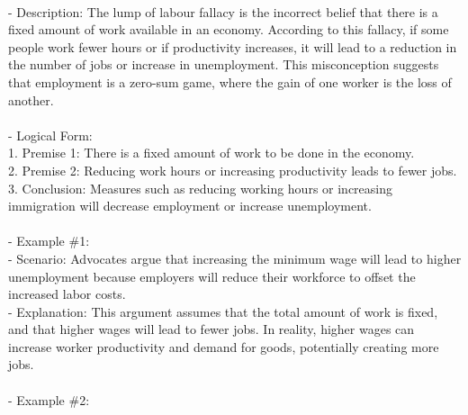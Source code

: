 \documentclass[a4paper,12pt,single,pdftex]{scrartcl}
\begin{document}
    
      
    \\

    
      - Description: The lump of labour fallacy is the incorrect belief that there is a fixed amount of work available in an economy. According to this fallacy, if some people work fewer hours or if productivity increases, it will lead to a reduction in the number of jobs or increase in unemployment. This misconception suggests that employment is a zero-sum game, where the gain of one worker is the loss of another.
    \\

    
      
    \\

    
      - Logical Form:
    \\

    
        1. Premise 1: There is a fixed amount of work to be done in the economy.
    \\

    
        2. Premise 2: Reducing work hours or increasing productivity leads to fewer jobs.
    \\

    
        3. Conclusion: Measures such as reducing working hours or increasing immigration will decrease employment or increase unemployment.
    \\

    
      
    \\

    
      - Example \#1:
    \\

    
        - Scenario: Advocates argue that increasing the minimum wage will lead to higher unemployment because employers will reduce their workforce to offset the increased labor costs.
    \\

    
        - Explanation: This argument assumes that the total amount of work is fixed, and that higher wages will lead to fewer jobs. In reality, higher wages can increase worker productivity and demand for goods, potentially creating more jobs.
    \\

    
      
    \\

    
      - Example \#2:
    \\
\end{document}
